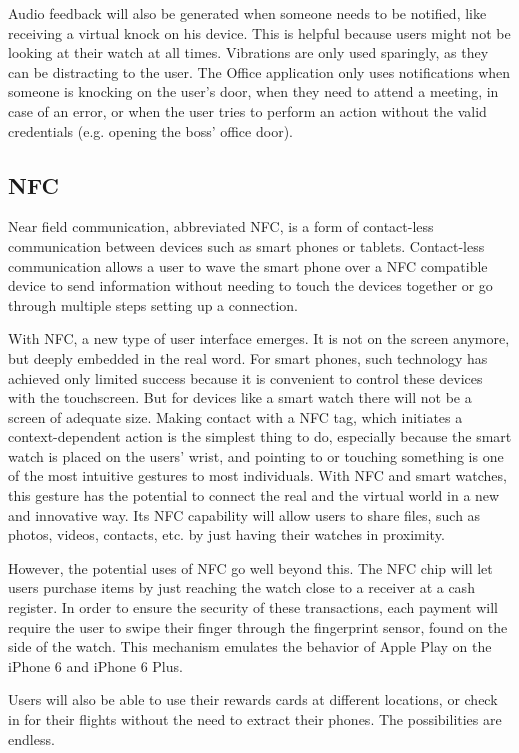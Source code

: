 \documentclass{article}
\begin{document}
Audio feedback will also be generated when someone needs to be notified, like receiving a virtual knock on his device. This is helpful because users might not be looking at their watch at all times. Vibrations are only used sparingly, as they can be distracting to the user. The Office application only uses notifications when someone is knocking on the user's door, when they need to attend a meeting, in case of an error, or when the user tries to perform an action without the valid credentials (e.g. opening the boss' office door). 

\subsection{NFC}
Near field communication, abbreviated NFC, is a form of contact-less communication between devices such as smart phones or tablets. Contact-less communication allows a user to wave the smart phone over a NFC compatible device to send information without needing to touch the devices together or go through multiple steps setting up a connection.

With NFC, a new type of user interface emerges. It is not on the screen anymore, but deeply embedded in the real word. For smart phones, such technology has achieved only limited success because it is convenient to control these devices with the touchscreen. But for devices like a smart watch there will not be a screen of adequate size. Making contact with a NFC tag, which initiates a context-dependent action is the simplest thing to do, especially because the smart watch is placed on the users' wrist, and pointing to or touching something is one of the most intuitive gestures to most individuals. With NFC and smart watches, this gesture has the potential to connect the real and the virtual world in a new and innovative way. Its NFC capability will allow users to share files, such as photos, videos, contacts, etc. by just having their watches in proximity. 

However, the potential uses of NFC go well beyond this. The NFC chip will let users purchase items by just reaching the watch close to a receiver at a cash register. In order to ensure the security of these transactions, each payment will require the user to swipe their finger through the fingerprint sensor, found on the side of the watch. This mechanism emulates the behavior of Apple Play on the iPhone 6 and iPhone 6 Plus. 

Users will also be able to use their rewards cards at different locations, or check in for their flights without the need to extract their phones. The possibilities are endless.
\end{document}
